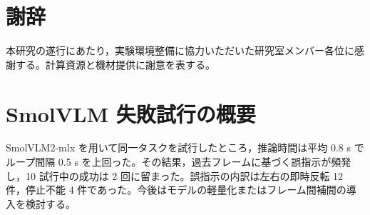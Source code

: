 \documentclass[a4paper,11pt]{ltjsreport}
\begin{document}
\chapter*{謝辞}
本研究の遂行にあたり，実験環境整備に協力いただいた研究室メンバー各位に感謝する。計算資源と機材提供に謝意を表する。




\appendix
\chapter{SmolVLM 失敗試行の概要}
SmolVLM2-mlx を用いて同一タスクを試行したところ，推論時間は平均 0.8 s でループ間隔 0.5 s を上回った。その結果，過去フレームに基づく誤指示が頻発し，10 試行中の成功は 2 回に留まった。誤指示の内訳は左右の即時反転 12 件，停止不能 4 件であった。今後はモデルの軽量化またはフレーム間補間の導入を検討する。
\end{document}
